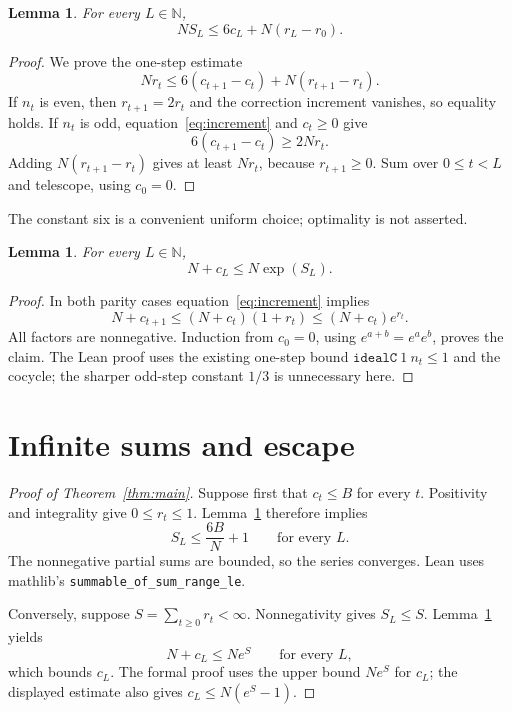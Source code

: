 \documentclass[11pt]{article}
\newtheorem{lemma}[theorem]{Lemma}
\newcommand{\N}{\mathbb N}
\begin{document}
\begin{lemma}\label{lem:ledger}
For every $L\in\N$,
\begin{equation}\label{eq:ledger}
N S_L\le6c_L+N(r_L-r_0).
\end{equation}
\end{lemma}
\begin{proof}
We prove the one-step estimate
\[
Nr_t\le6(c_{t+1}-c_t)+N(r_{t+1}-r_t).
\]
If $n_t$ is even, then $r_{t+1}=2r_t$ and the correction increment vanishes, so equality holds. If $n_t$ is odd, equation~\eqref{eq:increment} and $c_t\ge0$ give
\[
6(c_{t+1}-c_t)\ge2Nr_t.
\]
Adding $N(r_{t+1}-r_t)$ gives at least $Nr_t$, because $r_{t+1}\ge0$. Sum over $0\le t<L$ and telescope, using $c_0=0$.
\end{proof}
The constant six is a convenient uniform choice; optimality is not asserted.

\begin{lemma}\label{lem:exp}
For every $L\in\N$,
\begin{equation}\label{eq:exp}
N+c_L\le N\exp(S_L).
\end{equation}
\end{lemma}
\begin{proof}
In both parity cases equation~\eqref{eq:increment} implies
\[
N+c_{t+1}\le(N+c_t)(1+r_t)\le(N+c_t)e^{r_t}.
\]
All factors are nonnegative. Induction from $c_0=0$, using $e^{a+b}=e^a e^b$, proves the claim. The Lean proof uses the existing one-step bound $\texttt{idealC}\ 1\ n_t\le1$ and the cocycle; the sharper odd-step constant $1/3$ is unnecessary here.
\end{proof}

\newpage
\section{Infinite sums and escape}
\begin{proof}[Proof of Theorem~\ref{thm:main}]
Suppose first that $c_t\le B$ for every $t$. Positivity and integrality give $0\le r_t\le1$. Lemma~\ref{lem:ledger} therefore implies
\[
S_L\le\frac{6B}{N}+1\qquad\text{for every }L.
\]
The nonnegative partial sums are bounded, so the series converges. Lean uses mathlib's \texttt{summable\_of\_sum\_range\_le}.

Conversely, suppose $S=\sum_{t\ge0}r_t<\infty$. Nonnegativity gives $S_L\le S$. Lemma~\ref{lem:exp} yields
\[
N+c_L\le Ne^S\qquad\text{for every }L,
\]
which bounds $c_L$. The formal proof uses the upper bound $Ne^S$ for $c_L$; the displayed estimate also gives $c_L\le N(e^S-1)$.
\end{proof}
\end{document}
